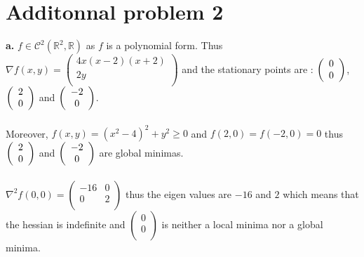 \documentclass{article}
\begin{document}
\section*{Additonnal problem 2}
\textbf{a.} $f\in\mathcal{C}^2(\mathbb{R}^2,\mathbb{R})$ as $f$ is a polynomial form. Thus $\nabla f(x,y) = \left(\begin{array}{c}
    4x(x-2)(x+2)\\
    2y\\
\end{array}\right)$ and the stationary points are : $\left(\begin{array}[]{c}
    0\\
    0\\
\end{array}\right)$, $\left(\begin{array}[]{c}
    2\\
    0\\
\end{array}\right)$ and $\left(\begin{array}[]{c}
    -2\\
    0\\
\end{array}\right)$.
\\\\
Moreover, $f(x,y) = (x^2-4)^2+y^2\ge 0$ and $f(2,0) = f(-2,0) = 0$ thus $\left(\begin{array}[]{c}
    2\\
    0\\
\end{array}\right)$ and $\left(\begin{array}[]{c}
    -2\\
    0\\
\end{array}\right)$ are global minimas.
\\\\
$\nabla^2f(0,0) = \left(\begin{array}{cc}
    -16&0\\
    0&2\\
\end{array}\right)$ thus the eigen values are $-16$ and $2$ which means that the hessian is indefinite and $\left(\begin{array}{c}
    0\\
    0\\
\end{array}\right)$ is neither a local minima nor a global minima.
\\\\
\end{document}
